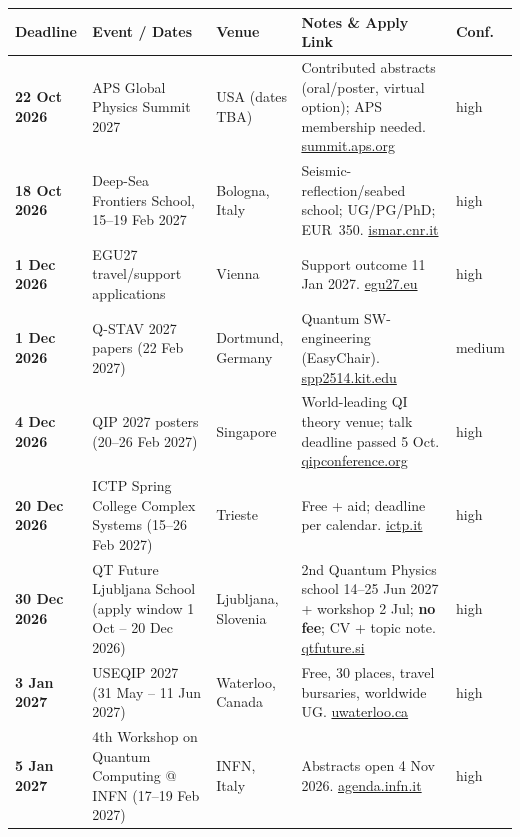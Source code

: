 \documentclass[11pt,a4paper]{article}
\begin{document}
\begin{longtable}{@{}p{3.2cm}p{3.0cm}p{2.5cm}p{5.2cm}p{1.6cm}@{}}
\toprule
\textbf{Deadline} & \textbf{Event / Dates} & \textbf{Venue} & \textbf{Notes \& Apply Link} & \textbf{Conf.} \\
\midrule
\endhead
\textbf{22 Oct 2026} & APS Global Physics Summit 2027 & USA (dates TBA) & Contributed abstracts (oral/poster, virtual option); APS membership needed. \href{https://summit.aps.org/attend/abstracts/}{summit.aps.org} & high \\
\midrule
\textbf{18 Oct 2026} & Deep-Sea Frontiers School, 15--19 Feb 2027 & Bologna, Italy & Seismic-reflection/seabed school; UG/PG/PhD; EUR~350. \href{https://www.ismar.cnr.it/en/deep-sea-frontiers-school/}{ismar.cnr.it} & high \\
\midrule
\textbf{1 Dec 2026} & EGU27 travel/support applications & Vienna & Support outcome 11 Jan 2027. \href{https://www.egu27.eu/about/deadlines_and_milestones.html}{egu27.eu} & high \\
\midrule
\textbf{1 Dec 2026} & Q-STAV 2027 papers (22 Feb 2027) & Dortmund, Germany & Quantum SW-engineering (EasyChair). \href{https://www.spp2514.kit.edu/Q-STAV_2027.php}{spp2514.kit.edu} & medium \\
\midrule
\textbf{4 Dec 2026} & QIP 2027 posters (20--26 Feb 2027) & Singapore & World-leading QI theory venue; talk deadline passed 5 Oct. \href{https://qipconference.org/2027/call/}{qipconference.org} & high \\
\midrule
\textbf{20 Dec 2026} & ICTP Spring College Complex Systems (15--26 Feb 2027) & Trieste & Free + aid; deadline per calendar. \href{https://www.ictp.it/home/scientific-calendar}{ictp.it} & high \\
\midrule
\textbf{30 Dec 2026} & QT Future Ljubljana School (apply window 1 Oct -- 20 Dec 2026) & Ljubljana, Slovenia & 2nd Quantum Physics school 14--25 Jun 2027 + workshop 2 Jul; \textbf{no fee}; CV + topic note. \href{https://www.qtfuture.si/summer-school-and-workshop-2027}{qtfuture.si} & high \\
\midrule
\textbf{3 Jan 2027} & USEQIP 2027 (31 May -- 11 Jun 2027) & Waterloo, Canada & Free, 30 places, travel bursaries, worldwide UG. \href{https://uwaterloo.ca/institute-for-quantum-computing/events/undergraduate-school-experimental-quantum-information-0}{uwaterloo.ca} & high \\
\midrule
\textbf{5 Jan 2027} & 4th Workshop on Quantum Computing @ INFN (17--19 Feb 2027) & INFN, Italy & Abstracts open 4 Nov 2026. \href{https://agenda.infn.it/event/53380/abstracts/}{agenda.infn.it} & high \\

\end{longtable}
\end{document}
